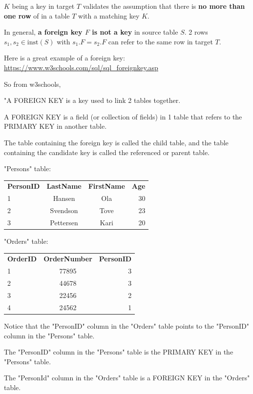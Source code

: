$K$ being a key in target $T$ validates the assumption that there is \textbf{no more than one row} of in a table $T$ with a matching key $K$.

In general, \textbf{ a foreign key $F$ is not a key} in source table $S$. 2 rows $s_1, s_2 \in \text{inst}(S)$ with $s_1.F = s_2.F$ can refer to the same row in target $T$.

Here is a great example of a foreign key: \url{https://www.w3schools.com/sql/sql_foreignkey.asp}

So from w3schools, 

"A FOREIGN KEY is a key used to link 2 tables together.

A FOREIGN KEY is a field (or collection of fields) in 1 table that refers to the PRIMARY KEY in another table.

The table containing the foreign key is called the child table, and the table containing the candidate key is called the referenced or parent table.

"Persons" table:

\begin{tabular}{|l |c |c |r|}
\textbf{PersonID} & \textbf{LastName} & \textbf{FirstName} & \textbf{Age} \\
1 & Hansen & Ola & 30 \\
2 & Svendson & Tove & 23 \\
3 & Pettersen & Kari & 20 
\end{tabular}

"Orders" table:

\begin{tabular}{ | l | c | r | }
	\textbf{OrderID} & \textbf{OrderNumber} & \textbf{PersonID} \\ 
	1 & 77895 & 3 \\
	2 & 44678 & 3 \\
	3 & 22456 & 2 \\
	4 & 24562 & 1 
\end{tabular}

Notice that the "PersonID" column in the "Orders" table points to the "PersonID" column in the "Persons" table.

The "PersonID" column in the "Persons" table is the PRIMARY KEY in the "Persons" table.

The "PersonId" column in the "Orders" table is a FOREIGN KEY in the "Orders" table.

